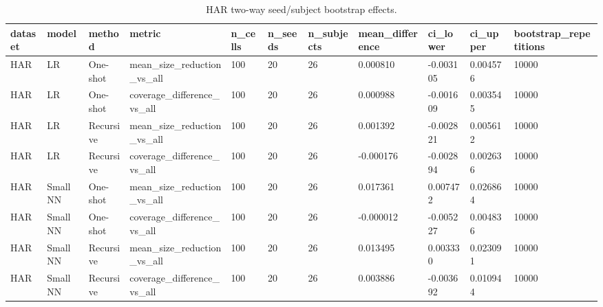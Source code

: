 \begin{table}[t]
\centering
\caption{HAR two-way seed/subject bootstrap effects.}
\label{tab:har-subject-effects}
\begin{tabular}{lllllllllll}
\hline
dataset & model & method & metric & n\_cells & n\_seeds & n\_subjects & mean\_difference & ci\_lower & ci\_upper & bootstrap\_repetitions \\
\hline
HAR & LR & One-shot & mean\_size\_reduction\_vs\_all & 100 & 20 & 26 & 0.000810 & -0.003105 & 0.004576 & 10000 \\
HAR & LR & One-shot & coverage\_difference\_vs\_all & 100 & 20 & 26 & 0.000988 & -0.001609 & 0.003545 & 10000 \\
HAR & LR & Recursive & mean\_size\_reduction\_vs\_all & 100 & 20 & 26 & 0.001392 & -0.002821 & 0.005612 & 10000 \\
HAR & LR & Recursive & coverage\_difference\_vs\_all & 100 & 20 & 26 & -0.000176 & -0.002894 & 0.002636 & 10000 \\
HAR & Small NN & One-shot & mean\_size\_reduction\_vs\_all & 100 & 20 & 26 & 0.017361 & 0.007472 & 0.026864 & 10000 \\
HAR & Small NN & One-shot & coverage\_difference\_vs\_all & 100 & 20 & 26 & -0.000012 & -0.005227 & 0.004836 & 10000 \\
HAR & Small NN & Recursive & mean\_size\_reduction\_vs\_all & 100 & 20 & 26 & 0.013495 & 0.003330 & 0.023091 & 10000 \\
HAR & Small NN & Recursive & coverage\_difference\_vs\_all & 100 & 20 & 26 & 0.003886 & -0.003692 & 0.010944 & 10000 \\
\hline
\end{tabular}
\end{table}
